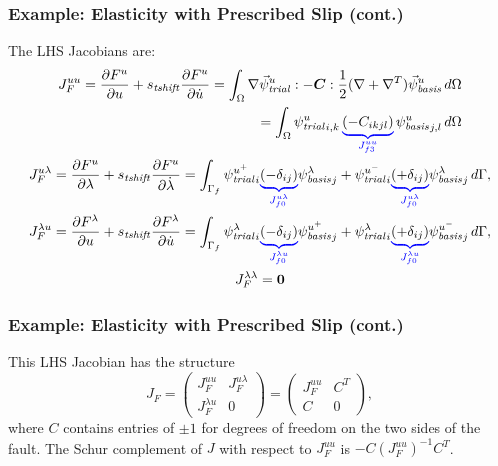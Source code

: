 \documentclass[aspectratio=169]{beamer}
\begin{document}
\begin{frame}
  \frametitle{Example: Elasticity with Prescribed Slip (cont.)}
  \summary{}

  The LHS Jacobians are:
\begin{gather}
  \begin{split}
  J_F^{uu} = \frac{\partial F^u}{\partial u} + s_\mathit{tshift} \frac{\partial F^u}{\partial \dot{u}}
      = \int_\Omega \nabla \trialvec[u] : -\tensor{C} : \frac{1}{2}(\nabla + \nabla^T)\basisvec[u] 
\, d\Omega \\
= \int_\Omega \trialscalar[u]_{i,k} \, \eqnannotate{\left( -C_{ikjl} \right)}{J_{f3}^{uu}} \, \basisscalar[u]_{j,l}\, d\Omega
\end{split}\\
  J_F^{u\lambda} = \frac{\partial F^u}{\partial \lambda} + s_\mathit{tshift} \frac{\partial F^u}{\partial \dot{\lambda}}
      = \int_{\Gamma_{f}} \trialscalar[u^+]_i \eqnannotate{\left(-\delta_{ij}\right)}{J^{u\lambda}_{f0}} \basisscalar[\lambda]_j
                   + \trialscalar[u^-]_i \eqnannotate{\left(+\delta_{ij}\right)}{J^{u\lambda}_{f0}} \basisscalar[\lambda]_j\, d\Gamma, \\
  J_F^{\lambda u} = \frac{\partial F^\lambda}{\partial u} + s_\mathit{tshift} \frac{\partial F^\lambda}{\partial \dot{u}}
      = \int_{\Gamma_{f}} \trialscalar[\lambda]_i 
                    \eqnannotate{\left(-\delta_{ij}\right)}{J^{\lambda u}_{f0}} \basisscalar[u^+]_j
                    + \trialscalar[\lambda]_i \eqnannotate{\left(+\delta_{ij}\right)}{J^{\lambda u}_{f0}} \basisscalar[u^-]_j \, d\Gamma, \\
  J_F^{\lambda \lambda} = \tensor{0}
\end{gather}

\end{frame}


\begin{frame}
  \frametitle{Example: Elasticity with Prescribed Slip (cont.)}
  \summary{}

  This LHS Jacobian has the structure
  \begin{equation}
    J_F = \left( \begin{array} {cc} J_F^{uu} & J_F^{u\lambda} \\ J_F^{\lambda u} & 0 \end{array} \right)
    = \left( \begin{array} {cc} J_F^{uu} & C^T \\ C & 0 \end{array} \right),
  \end{equation}
  where $C$ contains entries of $\pm 1$ for degrees of freedom on the two sides of the fault.
  The Schur complement of $J$ with respect to $J_F^{uu}$ is $-C\left(J_F^{uu}\right)^{-1}C^T$.

\end{frame}
\end{document}
